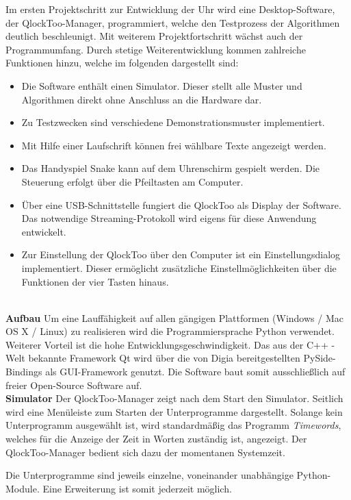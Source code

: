 \begin{multicols}{2}
Im ersten Projektschritt zur Entwicklung der Uhr wird eine Desktop-Software, der QlockToo-Manager, programmiert, welche den Testprozess der Algorithmen deutlich beschleunigt. Mit weiterem Projektfortschritt wächst auch der Programmumfang. Durch stetige Weiterentwicklung kommen zahlreiche Funktionen hinzu, welche im folgenden dargestellt sind:

\begin{itemize}

\item Die Software enthält einen Simulator. Dieser stellt alle Muster und Algorithmen direkt ohne Anschluss an die Hardware dar.
\item Zu Testzwecken sind verschiedene Demonstrationsmuster implementiert.
\item Mit Hilfe einer Laufschrift können frei wählbare Texte angezeigt werden.
\item Das Handyspiel Snake kann auf dem Uhrenschirm gespielt werden. Die Steuerung erfolgt über die Pfeiltasten am Computer.
\item Über eine USB-Schnittstelle fungiert die QlockToo als Display der Software. Das notwendige Streaming-Protokoll wird eigens für diese Anwendung entwickelt.
\item Zur Einstellung der QlockToo über den Computer ist ein Einstellungsdialog implementiert. Dieser ermöglicht zusätzliche Einstellmöglichkeiten über die Funktionen der vier Tasten hinaus.
\end{itemize}
\ \\
\textbf{Aufbau} Um eine Lauffähigkeit auf allen gängigen Plattformen (Windows / Mac OS X / Linux) zu realisieren wird die Programmiersprache Python verwendet. Weiterer Vorteil ist die hohe Entwicklungsgeschwindigkeit.
Das aus der C++ - Welt bekannte Framework Qt wird über die von Digia bereitgestellten PySide-Bindings als GUI-Framework genutzt. Die Software baut somit ausschließlich auf freier Open-Source Software auf.
\ \\

\textbf{Simulator} Der QlockToo-Manager zeigt nach dem Start den Simulator. Seitlich wird eine Menüleiste zum Starten der Unterprogramme dargestellt.
Solange kein Unterprogramm ausgewählt ist, wird standardmäßig das Programm \emph{Timewords}, welches für die Anzeige der Zeit in Worten zuständig ist, angezeigt. Der QlockToo-Manager bedient sich dazu der momentanen Systemzeit.

Die Unterprogramme sind jeweils einzelne, voneinander unabhängige Python-Module. Eine Erweiterung ist somit jederzeit möglich.


\end{multicols}
